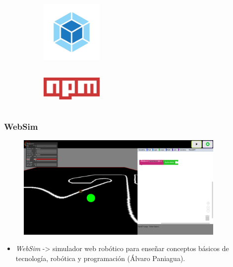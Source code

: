 \documentclass[xcolor={table}]{beamer}
\begin{document}
\begin{frame}
\begin{figure}[H]
\begin{subfigure}{\textwidth}
                \label{fig:figure2_7}
                \end{subfigure}\hfill
                \begin{subfigure}{\textwidth}                      \includegraphics[width=3cm, height=3cm]{img/webpack.jpeg}
                    \label{fig:figure2_9}
                    \end{subfigure}\hfill
                    \begin{subfigure}{\textwidth}
                        \includegraphics[width=3cm, height=2cm]{img/npm.png}
                    \label{fig:figure2_8}
                    \end{subfigure}\hfill
                    \label{fig:herramientas}
                    \end{figure}
        \end{frame}
        
        
	\begin{frame}
	\frametitle{WebSim}
	    \begin{figure}
	        \centering
	        \includegraphics[width=0.9\textwidth]{img/interfaz-websim.png}
	        \label{fig:websim}
	    \end{figure}
	    \begin{itemize}
            \begin{itemize}
    	    \item \textit{WebSim} -> simulador web robótico  para enseñar conceptos básicos de tecnología, robótica y programación (Álvaro Paniagua).
	     \end{itemize}{}
	\end{itemize}
\end{frame}
		
\end{document}
